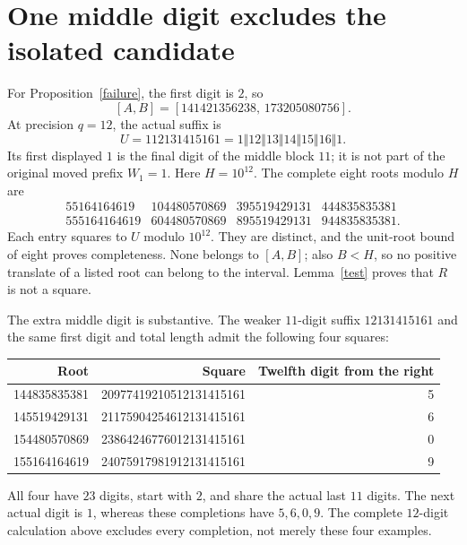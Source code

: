 \documentclass[9pt]{extarticle}
\begin{document}
\section{One middle digit excludes the isolated candidate}\label{example}
For Proposition~\ref{failure}, the first digit is $2$, so
\[
 [A,B]=[141421356238,\,173205080756].
\]
At precision $q=12$, the actual suffix is
\[
 U=112131415161=1\Vert12\Vert13\Vert14\Vert15\Vert16\Vert1.
\]
Its first displayed $1$ is the final digit of the middle block $11$;
it is not part of the original moved prefix $W_1=1$.
Here $H=10^{12}$. The complete eight roots modulo $H$ are
\[
\begin{array}{rrrr}
55164164619&104480570869&395519429131&444835835381\\
555164164619&604480570869&895519429131&944835835381.
\end{array}
\]
Each entry squares to $U$ modulo $10^{12}$. They are distinct, and the
unit-root bound of eight proves completeness. None belongs to $[A,B]$;
also $B<H$, so no positive translate of a listed root can belong to the
interval. Lemma~\ref{test} proves that $R$ is not a square.

The extra middle digit is substantive. The weaker $11$-digit suffix
$12131415161$ and the same first digit and total length admit the
following four squares:
\begin{center}
\begin{tabular}{rrr}
\toprule
Root&Square&Twelfth digit from the right\\
\midrule
144835835381&20977419210512131415161&5\\
145519429131&21175904254612131415161&6\\
154480570869&23864246776012131415161&0\\
155164164619&24075917981912131415161&9\\
\bottomrule
\end{tabular}
\end{center}
All four have $23$ digits, start with $2$, and share the actual last
$11$ digits. The next actual digit is $1$, whereas these completions
have $5,6,0,9$. The complete $12$-digit calculation above excludes
every completion, not merely these four examples.
\end{document}
